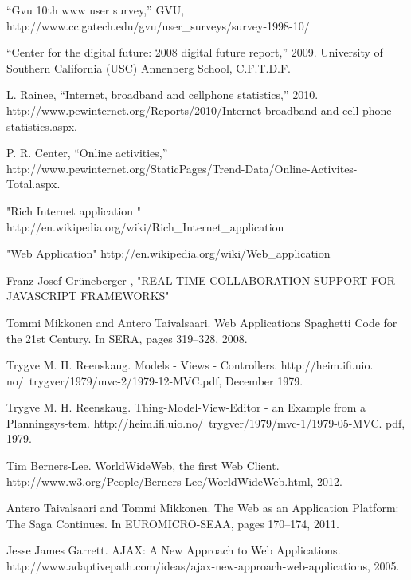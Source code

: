 \documentclass[14pt,a4paper]{extreport}
\begin{document}
\begin{thebibliography}{99}

 {“Gvu 10th www user survey,” GVU, http://www.cc.gatech.edu/gvu/user\_surveys/survey-1998-10/}

 “Center for the digital future: 2008 digital future report,” 2009. University of Southern California (USC) Annenberg School, C.F.T.D.F.

 {L. Rainee, “Internet, broadband and cellphone statistics,” 2010. http://www.pewinternet.org/Reports/2010/Internet-broadband-and-cell-phone-statistics.aspx.}

 P. R. Center, “Online activities,” http://www.pewinternet.org/StaticPages/Trend-Data/Online-Activites-Total.aspx.

 "Rich Internet application " http://en.wikipedia.org/wiki/Rich\_Internet\_application

 "Web Application" http://en.wikipedia.org/wiki/Web\_application

 Franz Josef Grüneberger , "REAL-TIME COLLABORATION SUPPORT FOR JAVASCRIPT FRAMEWORKS"

 Tommi Mikkonen and Antero Taivalsaari. Web Applications Spaghetti Code for the 21st Century. In SERA, pages 319–328, 2008.

 Trygve M. H. Reenskaug. Models - Views - Controllers. http://heim.ifi.uio.
no/~trygver/1979/mvc-2/1979-12-MVC.pdf, December 1979.

 Trygve M. H. Reenskaug. Thing-Model-View-Editor - an Example from a Planningsys-tem. http://heim.ifi.uio.no/~trygver/1979/mvc-1/1979-05-MVC.
pdf, 1979.

 Tim Berners-Lee. WorldWideWeb, the first Web Client. http://www.w3.org/People/Berners-Lee/WorldWideWeb.html, 2012.

Antero Taivalsaari and Tommi Mikkonen. The Web as an Application Platform: The Saga Continues. In EUROMICRO-SEAA, pages 170–174, 2011.

 Jesse James Garrett. AJAX: A New Approach to Web Applications. http://www.adaptivepath.com/ideas/ajax-new-approach-web-applications, 2005.
\end{thebibliography}
\end{document}
